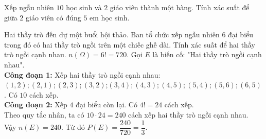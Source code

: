 \begin{bt}%
	Xếp ngẫu nhiên $10$ học sinh và $2$ giáo viên thành một hàng. Tính xác suất 
	để giữa $2$ giáo viên có đúng $5$ em học sinh.
\end{bt}

\begin{bt}%
	Hai thầy trò đến dự một buổi hội thảo. Ban tổ chức xếp ngẫu nhiên $6$ đại biểu trong đó có hai thầy trò ngồi trên một chiếc ghế dài. Tính xác suất để hai thầy trò ngồi cạnh nhau.
	\loigiai
	{
		$n(\Omega)=6 !=720$. Gọi $E$ là biến cố: "Hai thầy trò ngồi cạnh nhau".\\
		\textbf{Công đoạn 1:} Xếp hai thầy trò ngồi cạnh nhau:\\ 	$(1{,}2) ;(2{,}1) ;(2{,}3) ;(3{,}2)$;$(3{,}4) ;(4{,}3) ;(4{,}5) ;(5{,}4) ;(5{,}6) ;(6{,}5)$. Có $10$ cách xếp.\\
		\textbf{Công đoạn 2:} Xếp $4$ đại biểu còn lại. Có $4!=24$ cách xếp.\\
		Theo quy tắc nhân, ta có $10\cdot 24=240$ cách xếp hai thầy trò ngồi cạnh nhau.\\
		Vậy $n(E)=240$. Từ đó $P(E)=\dfrac{240}{720}=\dfrac{1}{3}$.
	}	
\end{bt}

